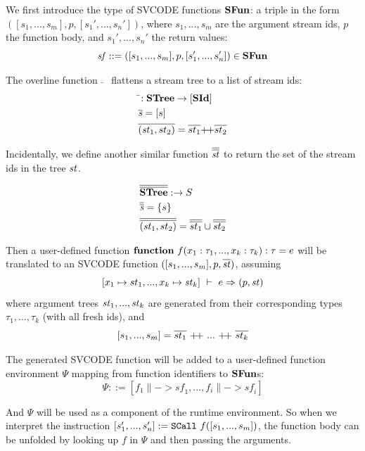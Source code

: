 \def\sf{\mathit{sf}}

We first introduce the type of SVCODE functions $\*{SFun}$: a triple in the form $([s_1,...,s_m], p, [s_1',...,s_n'])$, where $s_1,...,s_m$ are the argument stream ids, $p$ the function body, and $s_1',...,s_n'$ the return values:
$$ \sf ::= ([s_1,...,s_m], p, [s_1',...,s_n']) \in \*{SFun}$$

The overline function $\bar{}$ \ flattens a stream tree to a list of stream ids:
	\begin{align*}
&\bar{}: \STree \-> [\SId] \\
&\overline{\s} = [s] \\
&\overline{(\st_1,st_2)} = \overline{st_1} {\++} \overline{st_2}
\end{align*}

Incidentally, we define another similar function $\olol{\st}$ to return the set of the stream ids in the tree $\st$.

	\begin{align*}
&\olol{\STree}: \-> \S \\
&\olol{\s} = \{s\} \\
&\olol{(\st_1,st_2)} = \olol{st_1} \cup \olol{st_2}
\end{align*}

Then a user-defined function $\*{function} \  f(x_1: \tau_1, ..., x_k: \tau_k): \tau = e $ will be translated to an SVCODE function
$([s_1,...,s_m], p, \ol{\st})$, 
assuming
 $$\Trans{[x_1 \|-> st_1,..., x_k \|-> \st_k ]}{e}{}{}{\sfun{p}{\st}}$$ 
where argument trees $\st_1,...,\st_k$  are generated from their corresponding types $\tau_1,...,\tau_k$ (with all fresh ids), and
$$[s_1,...,s_m] = \ol{st_1} \ {\++} \ ... \ {\++} \ \ol{st_k}$$




The generated SVCODE function will be added to a user-defined function environment $\Psi$ mapping from function identifiers to $\*{SFun}$s:
$$ \Psi ::= [f_1 \|-> \sf_1,...,f_i \|-> \sf_i] $$

And $\Psi$ will be used as a component of the runtime environment. So when we interpret the instruction $\scall{f}{[s_1,...,s_m]}{[s_1',...,s_n']}$, the function body can be unfolded by looking up $f$ in $\Psi$ and then passing the arguments.


